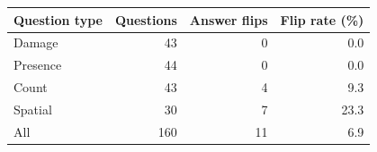 \begin{tabular}{lrrr}
\toprule
Question type & Questions & Answer flips & Flip rate (\%) \\
\midrule
Damage & 43 & 0 & 0.0 \\
Presence & 44 & 0 & 0.0 \\
Count & 43 & 4 & 9.3 \\
Spatial & 30 & 7 & 23.3 \\
\midrule
All & 160 & 11 & 6.9 \\
\bottomrule
\end{tabular}
